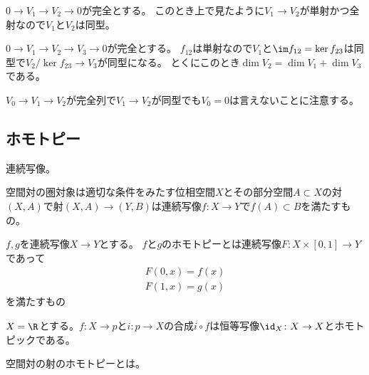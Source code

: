 \documentclass{jsarticle}
\begin{document}
\begin{eg}
$0\to V_1\to V_2\to 0$が完全とする。
このとき上で見たように$V_1\to V_2$が単射かつ全射なので$V_1$と$V_2$は同型。
\end{eg}

\begin{eg}
$0\to V_1\to V_2\to V_3\to 0$が完全とする。
$f_{12}$は単射なので$V_1$と$\im f_{12}=\ker f_{23}$は同型で$V_2/\ker f_{23}\to V_3$が同型になる。
とくにこのとき$\dim V_2=\dim V_1+\dim V_3$である。
\end{eg}

$V_0\to V_1\to V_2$が完全列で$V_1\to V_2$が同型でも$V_0=0$は言えないことに注意する。

\subsection{ホモトピー}
連続写像。

空間対の圏対象は適切な条件をみたす位相空間$X$とその部分空間$A\subset X$の対$(X,A)$で射$(X,A)\to (Y,B)$は連続写像$f\colon X\to Y$で$f(A)\subset B$を満たすもの。

\begin{dfn}[ホモトピー]
$f, g$を連続写像$X\to Y$とする。
$f$と$g$のホモトピーとは連続写像$F\colon X\times [0,1]\to Y$であって
\begin{align*}
F(0,x)=f(x)\\
F(1,x)=g(x)
\end{align*}
を満たすもの
\end{dfn}

\begin{eg}
$X=\R$とする。$f\colon X\to p$と$i\colon p\to X$の合成$i\circ f$は恒等写像$\id_X\colon X\to X$とホモトピックである。
\end{eg}

空間対の射のホモトピーとは。
\end{document}
